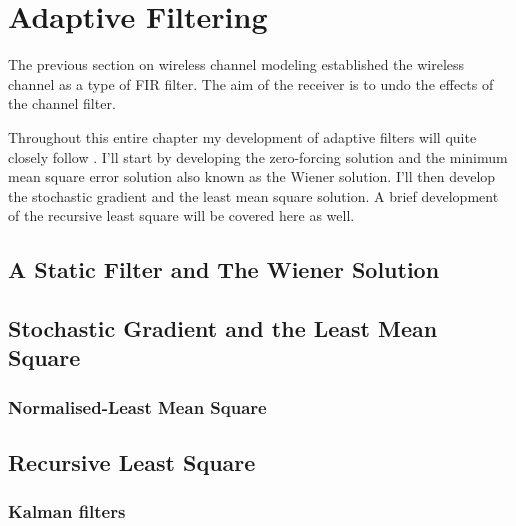 \chapter{Adaptive Filtering}

The previous section on wireless channel modeling established %
the wireless channel as a type of FIR filter. The aim of the %
receiver is to undo the effects of the channel filter. %



Throughout this entire chapter my development of adaptive filters %
will quite closely follow \cite{Hay02}. I'll start by %
developing the zero-forcing solution and the minimum mean square %
error solution also known as the Wiener solution. I'll then develop %
the stochastic gradient and the least mean square solution. A brief %
development of the recursive least square will be covered here as %
well.

\section{A Static Filter and The Wiener Solution}



\section{Stochastic Gradient and the Least Mean Square}
\subsection{Normalised-Least Mean Square}

\section{Recursive Least Square}
\subsection{Kalman filters}  %

